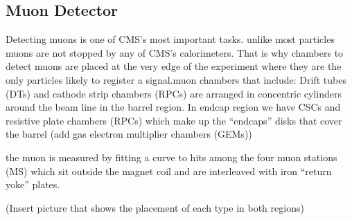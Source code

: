 \subsection{Muon Detector}

Detecting muons is one of CMS’s most important tasks. unlike most particles muons are not stopped by any of CMS’s calorimeters. That is why chambers to detect muons are placed at the very edge of the experiment where they are the only particles likely to register a signal.muon chambers that include: Drift tubes (DTs) and cathode strip chambers (RPCs) are arranged in concentric cylinders around the beam line in the barrel region. In endcap region we have CSCs and resistive plate chambers (RPCs) which make up the “endcaps” disks that cover the barrel (add gas electron multiplier chambers (GEMs)) 

the muon is measured by fitting a curve to hits among the four muon stations (MS) which sit outside the magnet coil and are interleaved with iron “return yoke” plates. 

 (Insert picture that shows the placement of each type in both regions) 

